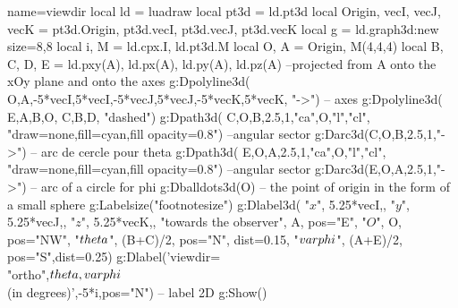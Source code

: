 \begin{luadraw}{name=viewdir}
local ld = luadraw
local pt3d = ld.pt3d
local Origin, vecI, vecJ, vecK = pt3d.Origin, pt3d.vecI, pt3d.vecJ, pt3d.vecK 
local g = ld.graph3d:new{ size={8,8} }
local i, M = ld.cpx.I, ld.pt3d.M
local O, A = Origin, M(4,4,4)
local B, C, D, E = ld.pxy(A), ld.px(A), ld.py(A), ld.pz(A) --projected from A onto the xOy plane and onto the axes
g:Dpolyline3d( {{O,A},{-5*vecI,5*vecI},{-5*vecJ,5*vecJ},{-5*vecK,5*vecK}}, "->") -- axes
g:Dpolyline3d( {{E,A,B,O}, {C,B,D}}, "dashed")
g:Dpath3d( {C,O,B,2.5,1,"ca",O,"l","cl"}, "draw=none,fill=cyan,fill opacity=0.8") --angular sector
g:Darc3d(C,O,B,2.5,1,"->") -- arc de cercle pour theta
g:Dpath3d( {E,O,A,2.5,1,"ca",O,"l","cl"}, "draw=none,fill=cyan,fill opacity=0.8") --angular sector
g:Darc3d(E,O,A,2.5,1,"->") -- arc of a circle for phi
g:Dballdots3d(O) -- the point of origin in the form of a small sphere
g:Labelsize("footnotesize")
g:Dlabel3d(
  "$x$", 5.25*vecI,{}, "$y$", 5.25*vecJ,{}, "$z$", 5.25*vecK,{},
  "towards the observer", A, {pos="E"},
  "$O$", O, {pos="NW"},
  "$\\theta$", (B+C)/2, {pos="N", dist=0.15},
  "$\\varphi$", (A+E)/2, {pos="S",dist=0.25})
g:Dlabel('viewdir=\\{"ortho",$\\theta,\\varphi$\\} (in degrees)',-5*i,{pos="N"}) -- label 2D
g:Show()
\end{luadraw}
